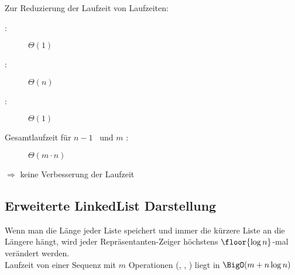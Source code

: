 Zur Reduzierung der Laufzeit von \union
{}
Laufzeiten:
\begin{description}
	\item[\makeset:] $\Theta(1)$
	\item[\find:] $\Theta(n)$
	\item[\union:] $\Theta(1)$
	\item[Gesamtlaufzeit für $n-1$ \union~und $m$ \find:] $\Theta(m\cdot n)$
\end{description}
$\Rightarrow$ keine Verbesserung der Laufzeit
\topbreak
\vspace*{-2\baselineskip}
\subsection{Erweiterte LinkedList Darstellung}
\vspace*{-3\baselineskip}
Wenn man die Länge jeder Liste speichert und immer die kürzere Liste an die Längere hängt, wird jeder Repräsentanten-Zeiger höchstens $\floor{\log n}$-mal verändert werden.\\
Laufzeit von einer Sequenz mit $m$ Operationen (\makeset, \union, \find) liegt in $\BigO(m+n\log n)$
\\\\